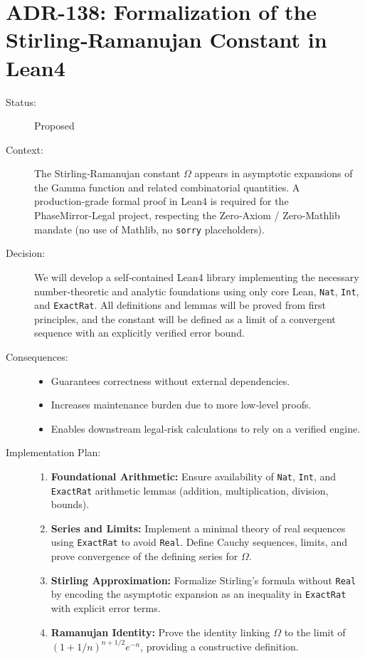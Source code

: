 \section*{ADR-138: Formalization of the Stirling‑Ramanujan Constant in Lean4}
\label{adr:138}
\begin{description}
  \item[Status:] Proposed
  \item[Context:] The Stirling‑Ramanujan constant $\Omega$ appears in asymptotic expansions of the Gamma function and related combinatorial quantities. A production‑grade formal proof in Lean4 is required for the PhaseMirror‑Legal project, respecting the Zero‑Axiom / Zero‑Mathlib mandate (no use of Mathlib, no \texttt{sorry} placeholders).
  \item[Decision:] We will develop a self‑contained Lean4 library implementing the necessary number‑theoretic and analytic foundations using only core Lean, \texttt{Nat}, \texttt{Int}, and \texttt{ExactRat}. All definitions and lemmas will be proved from first principles, and the constant will be defined as a limit of a convergent sequence with an explicitly verified error bound.
  \item[Consequences:]
    \begin{itemize}
      \item Guarantees correctness without external dependencies.
      \item Increases maintenance burden due to more low‑level proofs.
      \item Enables downstream legal‑risk calculations to rely on a verified engine.
    \end{itemize}
  \item[Implementation Plan:]
    \begin{enumerate}
      \item \textbf{Foundational Arithmetic:} Ensure availability of \texttt{Nat}, \texttt{Int}, and \texttt{ExactRat} arithmetic lemmas (addition, multiplication, division, bounds).
      \item \textbf{Series and Limits:} Implement a minimal theory of real sequences using \texttt{ExactRat} to avoid \texttt{Real}. Define Cauchy sequences, limits, and prove convergence of the defining series for $\Omega$.
      \item \textbf{Stirling Approximation:} Formalize Stirling's formula without \texttt{Real} by encoding the asymptotic expansion as an inequality in \texttt{ExactRat} with explicit error terms.
      \item \textbf{Ramanujan Identity:} Prove the identity linking $\Omega$ to the limit of $(1+1/n)^{n+1/2} e^{-n}$, providing a constructive definition.

\end{enumerate}
\end{description}
